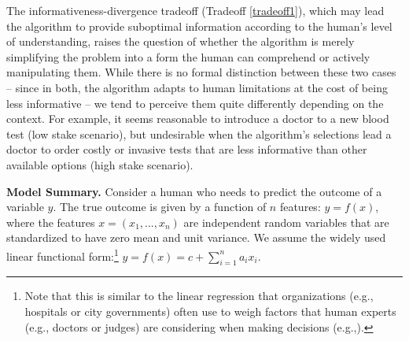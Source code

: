 The informativeness-divergence tradeoff (Tradeoff \ref{tradeoff1}), which may lead the algorithm to provide suboptimal information
according to 
the human's level of understanding, raises the question of whether the algorithm is merely simplifying the problem into a form the human can comprehend or actively manipulating them. While there is no formal distinction between these two cases -- since in both, the algorithm adapts to human limitations at the cost of being less informative -- we tend to perceive them quite differently depending on the context. For example, it seems reasonable to introduce a doctor to a new blood test (low stake scenario), but undesirable when the algorithm's selections lead a doctor to order costly or invasive tests that are less informative than other available options (high stake scenario).



\vspace{5pt} \noindent  \textbf{Model Summary.}
Consider a human who needs to predict the outcome of a variable $y$. The true outcome is given by a function of $n$ features: $y = f(x)$, where the features $x = (x_1,...,x_n)$ are independent random variables that are standardized to have zero mean and unit variance.
We assume the {widely used} linear functional form:\footnote{ Note that this is similar to the linear regression that 
organizations (e.g., hospitals or city governments) often use to weigh factors that human experts (e.g., doctors or judges) are considering when making decisions (e.g.,\cite{nyc_cja_2020, blatchford2000risk, alur2024integrating}).
} $y = f(x) = c + \sum_{i=1}^n a_i x_i$. 



